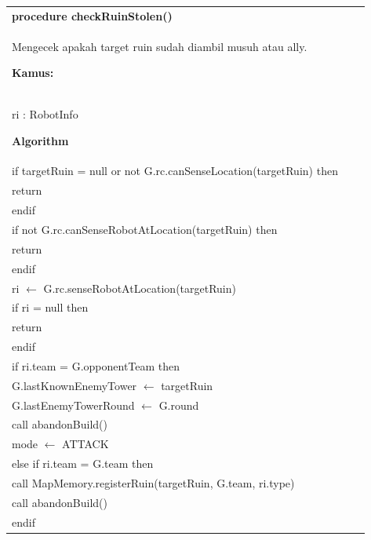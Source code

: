 \documentclass{article}
\newenvironment{pseudobox}
{
\centering
\begin{longtable}{|p{0.94\linewidth}|}
\hline
}
{
\\ \hline
\end{longtable}
\vspace{0.05cm}
}
\begin{document}
\begin{pseudobox}
\textbf{procedure checkRuinStolen()} \\
{ Mengecek apakah target ruin sudah diambil musuh atau ally. }

\textbf{Kamus:} \\
\hspace*{1em} ri : RobotInfo

\textbf{Algorithm} \\
\hspace*{1em} if targetRuin = null or not G.rc.canSenseLocation(targetRuin) then \\
\hspace*{2em} return \\
\hspace*{1em} endif \\

\hspace*{1em} if not G.rc.canSenseRobotAtLocation(targetRuin) then \\
\hspace*{2em} return \\
\hspace*{1em} endif \\

\hspace*{1em} ri $\leftarrow$ G.rc.senseRobotAtLocation(targetRuin) \\

\hspace*{1em} if ri = null then \\
\hspace*{2em} return \\
\hspace*{1em} endif \\

\hspace*{1em} if ri.team = G.opponentTeam then \\
\hspace*{2em} G.lastKnownEnemyTower $\leftarrow$ targetRuin \\
\hspace*{2em} G.lastEnemyTowerRound $\leftarrow$ G.round \\
\hspace*{2em} call abandonBuild() \\
\hspace*{2em} mode $\leftarrow$ ATTACK \\
\hspace*{1em} else if ri.team = G.team then \\
\hspace*{2em} call MapMemory.registerRuin(targetRuin, G.team, ri.type) \\
\hspace*{2em} call abandonBuild() \\
\hspace*{1em} endif
\end{pseudobox}
\end{document}
